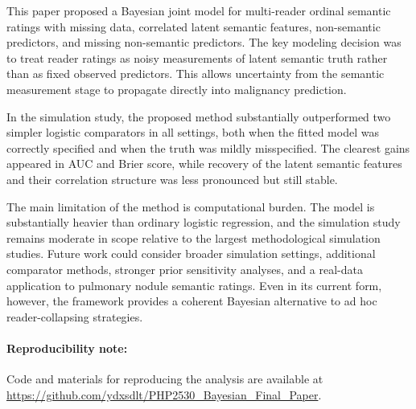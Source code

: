\documentclass[twoside,11pt]{article}
\begin{document}
This paper proposed a Bayesian joint model for multi-reader ordinal semantic ratings with missing data, correlated latent semantic features, non-semantic predictors, and missing non-semantic predictors. The key modeling decision was to treat reader ratings as noisy measurements of latent semantic truth rather than as fixed observed predictors. This allows uncertainty from the semantic measurement stage to propagate directly into malignancy prediction.

In the simulation study, the proposed method substantially outperformed two simpler logistic comparators in all settings, both when the fitted model was correctly specified and when the truth was mildly misspecified. The clearest gains appeared in AUC and Brier score, while recovery of the latent semantic features and their correlation structure was less pronounced but still stable.

The main limitation of the method is computational burden. The model is substantially heavier than ordinary logistic regression, and the simulation study remains moderate in scope relative to the largest methodological simulation studies. Future work could consider broader simulation settings, additional comparator methods, stronger prior sensitivity analyses, and a real-data application to pulmonary nodule semantic ratings. Even in its current form, however, the framework provides a coherent Bayesian alternative to ad hoc reader-collapsing strategies.

\paragraph{Reproducibility note:}

Code and materials for reproducing the analysis are available at \url{https://github.com/ydxsdlt/PHP2530_Bayesian_Final_Paper}.


\end{document}
